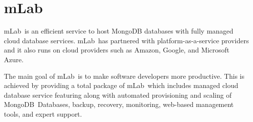 \section{mLab}

mLab\ is an efficient service to host MongoDB databases with fully
managed cloud database services. mLab\ has partnered with
platform-as-a-service providers and it also runs on cloud providers
such as Amazon, Google, and Microsoft Azure.

The main goal of mLab\ is to make software developers more productive.
This is achieved by providing a total package of mLab\ which includes
managed cloud database service featuring along with automated
provisioning and scaling of MongoDB\ Databases, backup, recovery,
monitoring, web-based management tools, and expert
support.~\cite{mLab}
